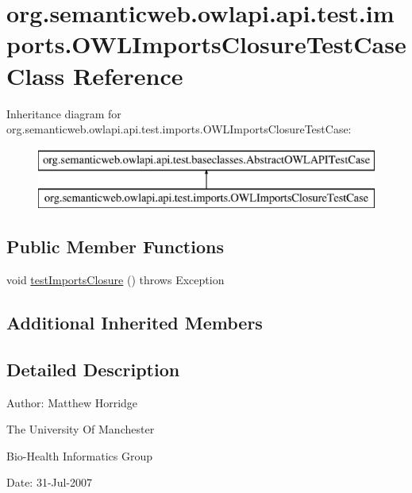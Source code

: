 \hypertarget{classorg_1_1semanticweb_1_1owlapi_1_1api_1_1test_1_1imports_1_1_o_w_l_imports_closure_test_case}{\section{org.\-semanticweb.\-owlapi.\-api.\-test.\-imports.\-O\-W\-L\-Imports\-Closure\-Test\-Case Class Reference}
\label{classorg_1_1semanticweb_1_1owlapi_1_1api_1_1test_1_1imports_1_1_o_w_l_imports_closure_test_case}
}
Inheritance diagram for org.\-semanticweb.\-owlapi.\-api.\-test.\-imports.\-O\-W\-L\-Imports\-Closure\-Test\-Case\-:\begin{figure}[H]
\begin{center}
\leavevmode
\includegraphics[height=2.000000cm]{classorg_1_1semanticweb_1_1owlapi_1_1api_1_1test_1_1imports_1_1_o_w_l_imports_closure_test_case}
\end{center}
\end{figure}
\subsection*{Public Member Functions}
\begin{DoxyCompactItemize}
\item 
void \hyperlink{classorg_1_1semanticweb_1_1owlapi_1_1api_1_1test_1_1imports_1_1_o_w_l_imports_closure_test_case_ac983990a33ba6b8a1f194b59d47d1aef}{test\-Imports\-Closure} ()  throws Exception 
\end{DoxyCompactItemize}
\subsection*{Additional Inherited Members}


\subsection{Detailed Description}
Author\-: Matthew Horridge\par
 The University Of Manchester\par
 Bio-\/\-Health Informatics Group\par
 Date\-: 31-\/\-Jul-\/2007\par
 \par
 

